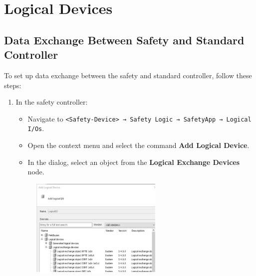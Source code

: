 \documentclass[a4paper,12pt]{article}
\begin{document}
\section{Logical Devices}

\subsection{Data Exchange Between Safety and Standard Controller}

To set up data exchange between the safety and standard controller, follow these steps:

\begin{enumerate}
	\item In the safety controller:
	\begin{itemize}
		\item Navigate to \texttt{<Safety-Device> → Safety Logic → SafetyApp → Logical I/Os}.
		\item Open the context menu and select the command \textbf{Add Logical Device}.
		\item In the dialog, select an object from the \textbf{Logical Exchange Devices} node.
	\end{itemize}
	\begin{figure}[H]
		\centering
		\includegraphics[width=0.6\textwidth]{18.JPG}
	\end{figure}
	

\end{enumerate}
\end{document}
